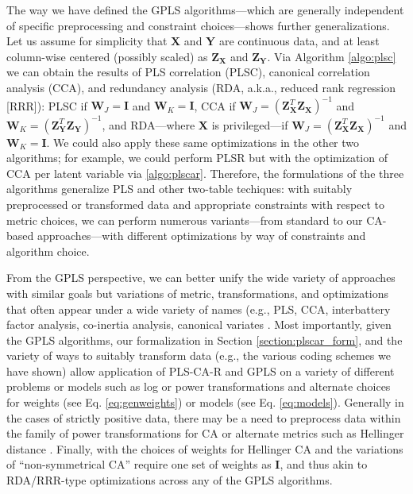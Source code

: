 \documentclass[12pt]{article}
\begin{document}
The way we have defined the GPLS algorithms---which are generally
independent of specific preprocessing and constraint choices---shows
further generalizations. Let us assume for simplicity that
\({\mathbf X}\) and \({\mathbf Y}\) are continuous data, and at least
column-wise centered (possibly scaled) as \({\mathbf Z}_{\mathbf X}\)
and \({\mathbf Z}_{\mathbf Y}\). Via Algorithm \ref{algo:plsc} we can
obtain the results of PLS correlation (PLSC), canonical correlation
analysis (CCA), and redundancy analysis (RDA, a.k.a., reduced rank
regression {[}RRR{]}): PLSC if \({\mathbf W}_{J} = {\mathbf I}\) and
\({\mathbf W}_{K} = {\mathbf I}\), CCA if
\({\mathbf W}_{J} = ({\mathbf Z}_{\mathbf X}^{T}{\mathbf Z}_{\mathbf X})^{-1}\)
and
\({\mathbf W}_{K} = ({\mathbf Z}_{\mathbf Y}^{T}{\mathbf Z}_{\mathbf Y})^{-1}\),
and RDA---where \({\mathbf X}\) is privileged---if
\({\mathbf W}_{J} = ({\mathbf Z}_{\mathbf X}^{T}{\mathbf Z}_{\mathbf X})^{-1}\)
and \({\mathbf W}_{K} = {\mathbf I}\). We could also apply these same
optimizations in the other two algorithms; for example, we could perform
PLSR but with the optimization of CCA per latent variable via
\ref{algo:plscar}. Therefore, the formulations of the three algorithms
generalize PLS and other two-table techiques: with suitably preprocessed
or transformed data and appropriate constraints with respect to metric
choices, we can perform numerous variants---from standard to our
CA-based approaches---with different optimizations by way of constraints
and algorithm choice.

From the GPLS perspective, we can better unify the wide variety of
approaches with similar goals but variations of metric, transformations,
and optimizations that often appear under a wide variety of names (e.g.,
PLS, CCA, interbattery factor analysis, co-inertia analysis, canonical
variates \citep[see][]{abdi2017canonical}. Most importantly, given the
GPLS algorithms, our formalization in Section \ref{section:plscar_form},
and the variety of ways to suitably transform data (e.g., the various
coding schemes we have shown) allow application of PLS-CA-R and GPLS on
a variety of different problems or models such as log or power
transformations and alternate choices for weights (see Eq.
\ref{eq:genweights}) or models (see Eq. \ref{eq:models}). Generally in
the cases of strictly positive data, there may be a need to preprocess
data within the family of power transformations for CA
\citep{greenacre2009power} or alternate metrics such as Hellinger
distance \citep{rao1995review, escofier1978analyse}. Finally, with the
choices of weights for Hellinger CA and the variations of
``non-symmetrical CA''
\citep{d1992non, kroonenberg1999nonsymmetric, takane1991relationships}
require one set of weights as \({\mathbf I}\), and thus akin to
RDA/RRR-type optimizations across any of the GPLS algorithms.
\end{document}
